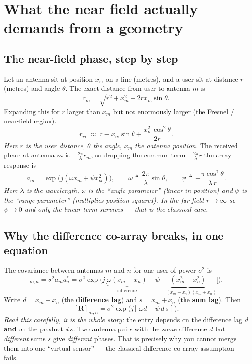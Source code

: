 \documentclass[11pt]{article}
\begin{document}
\section{What the near field actually demands from a geometry}

\subsection{The near-field phase, step by step}

Let an antenna sit at position $x_m$ on a line (metres), and a user sit at distance $r$ (metres) and
angle $\theta$. The exact distance from user to antenna $m$ is
\begin{equation}
r_m=\sqrt{r^2+x_m^2-2 r x_m\sin\theta}.
\end{equation}
Expanding this for $r$ larger than $x_m$ but not enormously larger (the Fresnel / near-field region):
\begin{equation}
r_m\;\approx\; r-x_m\sin\theta+\frac{x_m^2\cos^2\theta}{2r}.
\end{equation}
\emph{Here $r$ is the user distance, $\theta$ the angle, $x_m$ the antenna position.} The received
phase at antenna $m$ is $-\tfrac{2\pi}{\lambda}r_m$, so dropping the common term $-\tfrac{2\pi}{\lambda}r$
the array response is
\begin{equation}
a_m=\exp\!\big(j(\omega x_m+\psi x_m^2)\big),\qquad
\omega \triangleq \frac{2\pi}{\lambda}\sin\theta,\qquad
\psi \triangleq -\frac{\pi\cos^2\theta}{\lambda\, r}.
\end{equation}
\emph{Here $\lambda$ is the wavelength, $\omega$ is the ``angle parameter'' (linear in position) and
$\psi$ is the ``range parameter'' (multiplies position \emph{squared}). In the far field $r\to\infty$
so $\psi\to 0$ and only the linear term survives --- that is the classical case.}

\subsection{Why the difference co-array breaks, in one equation}

The covariance between antennas $m$ and $n$ for one user of power $\sigma^2$ is
\begin{equation}
[\mathbf{R}]_{m,n}=\sigma^2 a_m a_n^{*}
=\sigma^2\exp\!\Big(j\big[\underbrace{\omega(x_m-x_n)}_{\text{difference}}
+\psi\underbrace{(x_m^2-x_n^2)}_{=(x_m-x_n)(x_m+x_n)}\big]\Big).
\end{equation}
Write $d=x_m-x_n$ (the \textbf{difference lag}) and $s=x_m+x_n$ (the \textbf{sum lag}). Then
\begin{equation}
\boxed{\;[\mathbf{R}]_{m,n}=\sigma^2\exp\!\big(j[\,\omega d+\psi\, d\, s\,]\big).\;}
\end{equation}
\emph{Read this carefully, it is the whole story:} the entry depends on the difference lag $d$
\textbf{and} on the product $d\,s$. Two antenna pairs with the \emph{same} difference $d$ but
\emph{different} sums $s$ give \emph{different} phases. That is precisely why you cannot merge them
into one ``virtual sensor'' --- the classical difference co-array assumption fails.
\end{document}
